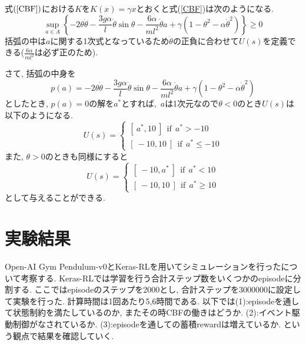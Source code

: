 \documentclass{jsarticle}
\begin{document}
式$(\ref{CBF})$における$K$を$K(x) = \gamma x$とおくと式(\ref{CBF})は次のようになる.
\begin{equation}
	\sup_{a\in A}\left\{-2\theta\dot{\theta}-\frac{3g\alpha}{l}\dot{\theta}\sin{\theta}-\frac{6\alpha}{ml^2}\dot{\theta} a+\gamma(1-\theta^2-\alpha\dot{\theta}^2)\right\} \geq 0 \label{special_cbf}
\end{equation}
括弧の中は$a$に関する1次式となっているため$\dot{\theta}$の正負に合わせて$U(s)$を定義できる($\frac{6\alpha}{ml^2}$は必ず正のため).\par
さて, 括弧の中身を
\begin{equation}
	p(a) = -2\theta\dot{\theta}-\frac{3g\alpha}{l}\dot{\theta}\sin{\theta}-\frac{6\alpha}{ml^2}\dot{\theta} a+\gamma(1-\theta^2-\alpha\dot{\theta}^2)
\end{equation}
としたとき, $p(a)=0$の解を$a^{*}$とすれば,~$a$は1次元なので$\theta<0$のとき$U(s)$は以下のようになる.
\begin{equation}
	U(s) = 
		\begin{cases}
			[~a^{*}, 10~]~~\textrm{if}~~ a^{*} > -10 \\
			[~-10, 10~]~~\textrm{if}~~ a^{*} \leq -10
		\end{cases}
\end{equation}
また, $\theta>0$のときも同様にすると
\begin{equation}
	U(s) = 
		\begin{cases}
			[~-10, a^{*}~]~~\textrm{if}~~ a^{*} < 10 \\
			[~-10, 10~]~~\textrm{if}~~ a^{*} \geq 10
		\end{cases}
\end{equation}
として与えることができる.

\section{実験結果}
Open-AI Gym Pendulum-v0とKeras-RLを用いてシミュレーションを行ったについて考察する. Keras-RLでは学習を行う合計ステップ数をいくつかのepisodeに分割する. ここではepisodeのステップを2000とし, 合計ステップを3000000に設定して実験を行った. 計算時間は1回あたり5,6時間である. 以下では(1):episodeを通して状態制約を満たしているのか, またその時CBFの働きはどうか. (2):イベント駆動制御がなされているか. (3):episodeを通しての蓄積rewardは増えているか.
という観点で結果を確認していく. 
\end{document}
